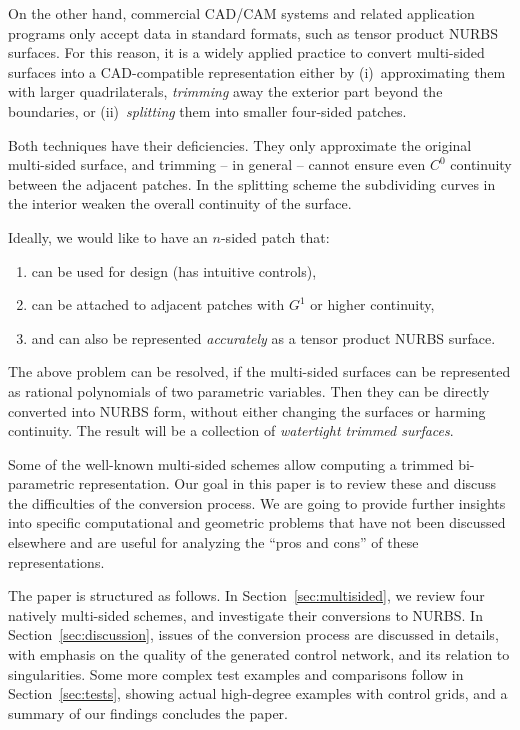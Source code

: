 \documentclass[9pt,academicons]{article}
\begin{document}
On the other hand, commercial CAD/CAM systems and related application programs only accept
data in standard formats, such as tensor product NURBS surfaces. For this reason, it is a
widely applied practice to convert multi-sided surfaces into a CAD-compatible
representation either by (i)~approximating them with larger quadrilaterals,
\emph{trimming} away the exterior part beyond the boundaries, or (ii)~\emph{splitting}
them into smaller four-sided patches.

Both techniques have their deficiencies. They only approximate the original multi-sided
surface, and trimming -- in general -- cannot ensure even $C^0$ continuity between the
adjacent patches. In the splitting scheme the subdividing curves in the interior
weaken the overall continuity of the surface.

Ideally, we would like to have an $n$-sided patch that:
\begin{enumerate}[label=\roman*),leftmargin=3\parindent]
\item can be used for design (has intuitive controls),
\item can be attached to adjacent patches with $G^1$ or higher continuity,
\item and can also be represented \emph{accurately} as a tensor product NURBS surface.
\end{enumerate}

The above problem can be resolved, if the multi-sided surfaces can be represented as rational
polynomials of two parametric variables. Then they can be directly converted into
NURBS form, without either changing the surfaces or harming continuity. The result will be
a collection of \emph{watertight trimmed surfaces}.
 
Some of the well-known multi-sided schemes allow computing a trimmed bi-parametric
representation. Our goal in this paper is to review these and discuss the difficulties of
the conversion process. We are going to provide further insights into specific
computational and geometric problems that have not been discussed elsewhere and are
useful for analyzing the ``pros and cons'' of these representations.

The paper is structured as follows. In Section~\ref{sec:multisided},
we review four natively multi-sided schemes, and investigate their conversions to NURBS.
In Section~\ref{sec:discussion}, issues of the conversion process are discussed in details,
with emphasis on the quality of the generated control network, and its relation to singularities.
Some more complex test examples and comparisons follow in Section~\ref{sec:tests},
showing actual high-degree examples with control grids,
and a summary of our findings concludes the paper.
\end{document}
